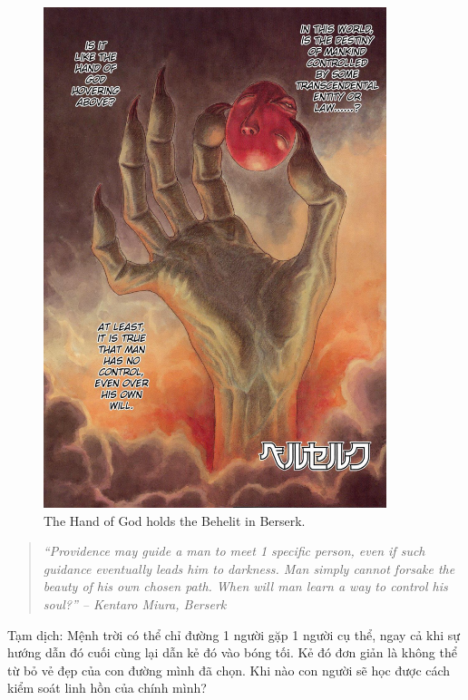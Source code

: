 \documentclass[12pt]{article}
\begin{document}
\begin{figure}[H]
	\centering
	\includegraphics[width = 10cm]{Berserk_behelit_color}
	\caption{The Hand of God holds the Behelit in Berserk.}
\end{figure}

\begin{quotation}\it
	``Providence may guide a man to meet 1 specific person, even if such guidance eventually leads him to darkness. Man simply cannot forsake the beauty of his own chosen path. When will man learn a way to control his soul?'' – {\sc Kentaro Miura}, {\it Berserk}
\end{quotation}
{\sf Tạm dịch}: Mệnh trời có thể chỉ đường 1 người gặp 1 người cụ thể, ngay cả khi sự hướng dẫn đó cuối cùng lại dẫn kẻ đó vào bóng tối. Kẻ đó đơn giản là không thể từ bỏ vẻ đẹp của con đường mình đã chọn. Khi nào con người sẽ học được cách kiểm soát linh hồn của chính mình?
	
\end{document}
